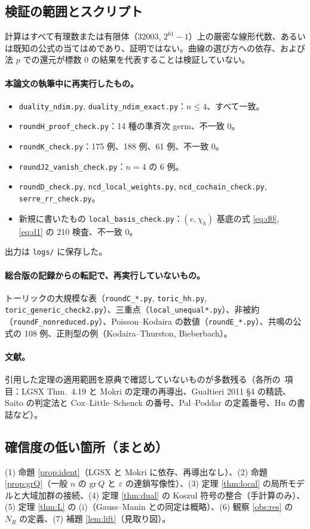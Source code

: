 \subsection{検証の範囲とスクリプト}
計算はすべて有理数または有限体（$32003$, $2^{61}-1$）上の厳密な線形代数、あるいは既知の公式の当てはめであり、証明ではない。曲線の選び方への依存、および法 $p$ での還元が標数 0 の結果を代表することは検証していない。
\paragraph{本論文の執筆中に再実行したもの。}
\begin{itemize}
\item \texttt{duality\_ndim.py}, \texttt{duality\_ndim\_exact.py}：$n\le4$、すべて一致。
\item \texttt{roundH\_proof\_check.py}：14 種の準斉次 germ、不一致 0。
\item \texttt{roundK\_check.py}：175 例、188 例、61 例、不一致 0。
\item \texttt{roundJ2\_vanish\_check.py}：$n=4$ の 6 例。
\item \texttt{roundD\_check.py}, \texttt{ncd\_local\_weights.py}, \texttt{ncd\_cochain\_check.py}, \texttt{serre\_rr\_check.py}。
\item 新規に書いたもの \texttt{local\_basis\_check.py}：$(e,\chi_h)$ 基底の式 \eqref{eq:d0}, \eqref{eq:d1} の 210 検査、不一致 0。
\end{itemize}
出力は \texttt{logs/} に保存した。
\paragraph{総合版の記録からの転記で、再実行していないもの。}トーリックの大規模な表（\texttt{roundC\_*.py}, \texttt{toric\_hh.py}, \texttt{toric\_generic\_check2.py}）、三重点（\texttt{local\_unequal*.py}）、非被約（\texttt{roundF\_nonreduced.py}）、Poisson--Kodaira の数値（\texttt{roundE\_*.py}）、共鳴の公式の 108 例、正則型の例（Kodaira--Thurston, Bieberbach）。
\paragraph{文献。}引用した定理の適用範囲を原典で確認していないものが多数残る（各所の\tQ\ 項目：LGSX Thm.~4.19 と Mokri の定理の再導出、Gualtieri 2011 \S4 の精読、Saito の判定法と Cox--Little--Schenck の番号、Pal--Poddar の定義番号、Hu の書誌など）。

\subsection{確信度の低い箇所（まとめ）}
(1) 命題 \ref{prop:ident}（LGSX と Mokri に依存、再導出なし）、(2) 命題 \ref{prop:grQ}（一般 $n$ の $\mathrm{gr}\,Q$ と $\varepsilon$ の連鎖写像性）、(3) 定理 \ref{thm:local} の局所モデルと大域加群の接続、(4) 定理 \ref{thm:dual} の Koszul 符号の整合（手計算のみ）、(5) 定理 \ref{thm:L} の (i)（Gauss--Manin との同定は概略）、(6) 観察 \ref{obs:res} の $N_R$ の定義、(7) 補題 \ref{lem:lift}（見取り図）。

